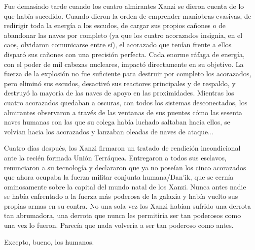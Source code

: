 \documentclass[spanish,12pt,a4paper, oneside]{book}
\begin{document}
    Fue demasiado tarde cuando los cuatro almirantes Xanzi se dieron cuenta de lo que había sucedido. Cuando dieron la orden de emprender maniobras evasivas, de redirigir toda la energía a los escudos, de cargar sus propios cañones o de abandonar las naves por completo (ya que los cuatro acorazados insignia, en el caos, olvidaron comunicarse entre sí), el acorazado que tenían frente a ellos disparó sus cañones con una precisión perfecta. Cada enorme ráfaga de energía, con el poder de mil cabezas nucleares, impactó directamente en su objetivo. La fuerza de la explosión no fue suficiente para destruir por completo los acorazados, pero eliminó sus escudos, desactivó sus reactores principales y de respaldo, y destruyó la mayoría de las naves de apoyo en las proximidades. Mientras los cuatro acorazados quedaban a oscuras, con todos los sistemas desconectados, los almirantes observaron a través de las ventanas de sus puentes cómo las sesenta naves humanas con las que su colega había luchado saltaban hacia ellos, se volvían hacia los acorazados y lanzaban oleadas de naves de ataque...

    Cuatro días después, los Xanzi firmaron un tratado de rendición incondicional ante la recién formada Unión Terráquea. Entregaron a todos sus esclavos, renunciaron a su tecnología y declararon que ya no poseían los cinco acorazados que ahora ocupaba la fuerza militar conjunta humana/Dan'ik, que se cernía ominosamente sobre la capital del mundo natal de los Xanzi. Nunca antes nadie se había enfrentado a la fuerza más poderosa de la galaxia y había vuelto sus propias armas en su contra. No una sola vez los Xanzi habían sufrido una derrota tan abrumadora, una derrota que nunca les permitiría ser tan poderosos como una vez lo fueron. Parecía que nada volvería a ser tan poderoso como antes.

    Excepto, bueno, los humanos.
\end{document}
